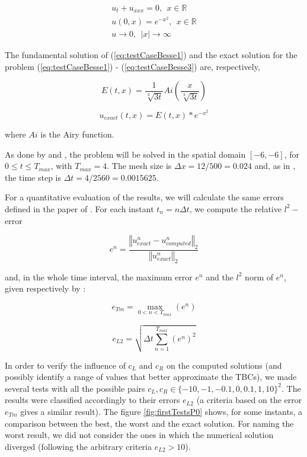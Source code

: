 \begin{gather}
\label{eq:testCaseBesse1}
 u_t + u_{xxx} = 0, \ \ x \in \mathbb{R} \\
 \label{eq:testCaseBesse2}
 u(0,x) = e^{-x^2}, \ \ x \in \mathbb{R}  \\
 \label{eq:testCaseBesse3}
 u \rightarrow 0, \ \ |x| \rightarrow \infty
\end{gather}

\indent The fundamental solution of (\ref{eq:testCaseBesse1}) and  the exact solution for the problem (\ref{eq:testCaseBesse1}) - (\ref{eq:testCaseBesse3}) are, respectively, 

\begin{equation}
    E(t,x) = \frac{1}{\sqrt[3]{3t}}Ai\left(\frac{x}{\sqrt[3]{3t}} \right)
\end{equation}

\begin{equation}
	\label{eq:exactSolution}
    u_{exact}(t,x) = E(t,x) * e^{-x^2}
\end{equation}

\noindent where $Ai$ is the Airy function.

\indent As done by \cite{zheng2008} and \cite{besse2015}, the problem will be solved in the spatial domain $[-6,-6]$, for $0 \leq t \leq T_{max}$, with $T_{max} = 4$. The mesh size is $\Delta x = 12/500 = 0.024$ and, as in \cite{besse2015}, the time step is $\Delta t = 4/2560 = 0.0015625$.

\indent For a quantitative evaluation of the results, we will calculate the same errors defined in the paper of \cite{besse2015}. For each instant $t_n = n\Delta t$, we compute the relative $l^2-$error

$$e^n = \frac{\left\Vert u_{exact}^n - u_{computed}^n\right\Vert_2}{\left\Vert u_{exact}^n\right\Vert_2}$$

\noindent and, in the whole time interval, the maximum error $e^n$ and the $l^2$ norm of $e^n$, given respectively by :

$$ e_{Tm} = \max\limits_{0 < n < T_{max}} (e^n) $$

$$ e_{L2} = \sqrt{ \Delta t \sum_{n=1}^{T_{max}} (e^n)^2 } $$

\indent In order to verify the influence of $c_L$ and $c_R$ on the computed solutions (and possibly identify a range of values that better approximate the TBCs), we made several tests with all the possible pairs $c_L,c_R \in \{-10,-1,-0.1,0,0.1,1,10\}^2$. The results were classified accordingly to their errors $e_{L2}$ (a criteria based on the error $e_{Tm}$ gives a similar result). The figure \ref{fig:firstTestsP0} shows, for some instants, a comparison between the best, the worst and the exact solution. For naming the worst result, we did not consider the ones in which the numerical solution diverged (following the arbitrary criteria $e_{L2} > 10$). 


